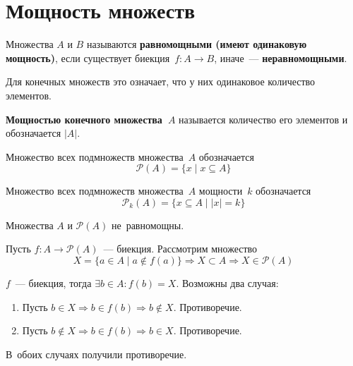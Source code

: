 \section{Мощность множеств}
Множества $A$ и $B$ называются \textbf{равномощными (имеют одинаковую мощность)}, если существует биекция~$f \colon A \to B$, иначе~--- \textbf{неравномощными}.

Для конечных множеств это означает, что у них одинаковое количество элементов.

 \textbf{Мощностью конечного множества~$A$} называется количество его элементов и обозначается $|A|$.

Множество всех подмножеств множества~$A$ обозначается
\begin{equation*}
\mathcal P(A) = \{ x \mid x \subseteq A \}
\end{equation*}

Множество всех подмножеств множества~$A$ мощности~$k$ обозначается
\begin{equation*}
\mathcal P_k(A) = \{ x \subseteq A \mid |x| = k \}
\end{equation*}

\begin{theorem}[Кантора]
Множества $A$ и $\mathcal P(A)$ не~равномощны.
\end{theorem}
\begin{proofcontra}
Пусть $f \colon A \to \mathcal P(A)$~--- биекция. Рассмотрим множество
\begin{equation*}
X = \{ a \in A \mid a \notin f(a) \} \Rightarrow X \subset A \Rightarrow X \in \mathcal P(A)
\end{equation*}

$f$~--- биекция, тогда $\exists b \in A \colon f(b) = X$.
Возможны два случая:
\begin{enumerate}
	\item Пусть $b \in X \Rightarrow b \in f(b) \Rightarrow b \notin X$.
	Противоречие.
	\item Пусть $b \notin X \Rightarrow b \in f(b) \Rightarrow b \in X$.
	Противоречие.
\end{enumerate}

В~обоих случаях получили противоречие.
\end{proofcontra}

